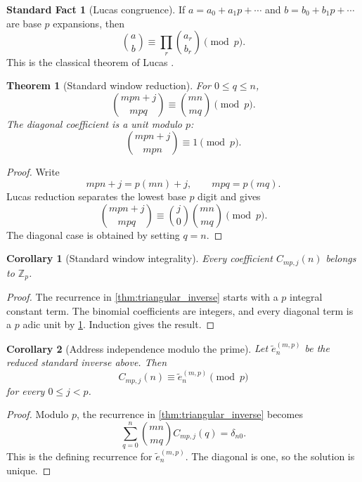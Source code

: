 \documentclass{aomart}
\newtheorem{theorem}{Theorem}[section]
\newtheorem{corollary}[corollary]{Corollary}
\theoremstyle{definition}
\newtheorem{standardfact}[standardfact]{Standard Fact}
\theoremstyle{remark}
\newcommand{\Zp}{\mathbb Z_p}
\begin{document}
\begin{standardfact}[Lucas congruence]\label{fact:lucas}
If \(a=a_0+a_1p+\cdots\) and \(b=b_0+b_1p+\cdots\) are base \(p\) expansions, then
\[
\binom ab
\equiv
\prod_r\binom{a_r}{b_r}
\pmod p.
\]
This is the classical theorem of Lucas \cite{Lucas1878a}.
\end{standardfact}

\begin{theorem}[Standard window reduction]\label{thm:standard_window_reduction}
For \(0\leq q\leq n\),
\[
\boxed{
\binom{mpn+j}{mpq}
\equiv
\binom{mn}{mq}
\pmod p.
}
\]
The diagonal coefficient is a unit modulo \(p\):
\[
\binom{mpn+j}{mpn}
\equiv1
\pmod p.
\]
\end{theorem}

\begin{proof}
Write
\[
mpn+j=p(mn)+j,
\qquad
mpq=p(mq).
\]
Lucas reduction separates the lowest base \(p\) digit and gives
\[
\binom{mpn+j}{mpq}
\equiv
\binom j0
\binom{mn}{mq}
\pmod p.
\]
The diagonal case is obtained by setting \(q=n\).
\end{proof}

\begin{corollary}[Standard window integrality]\label{cor:standard_integrality}
Every coefficient \(C_{mp,j}(n)\) belongs to \(\Zp\).
\end{corollary}

\begin{proof}
The recurrence in \cref{thm:triangular_inverse} starts with a \(p\) integral constant term. The binomial coefficients are integers, and every diagonal term is a \(p\) adic unit by \cref{thm:standard_window_reduction}. Induction gives the result.
\end{proof}

\begin{corollary}[Address independence modulo the prime]\label{cor:address_independence}
Let \(\widetilde e_n^{(m,p)}\) be the reduced standard inverse above. Then
\[
\boxed{
C_{mp,j}(n)
\equiv
\widetilde e_n^{(m,p)}
\pmod p
}
\]
for every \(0\leq j<p\).
\end{corollary}

\begin{proof}
Modulo \(p\), the recurrence in \cref{thm:triangular_inverse} becomes
\[
\sum_{q=0}^{n}
\binom{mn}{mq}
C_{mp,j}(q)
=
\delta_{n0}.
\]
This is the defining recurrence for \(\widetilde e_n^{(m,p)}\). The diagonal is one, so the solution is unique.
\end{proof}
\end{document}
